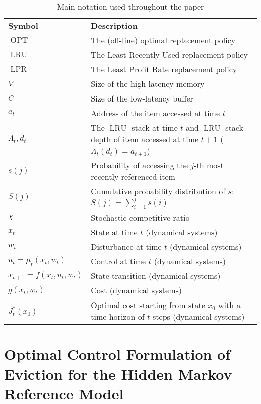 \documentclass[11pt,a4paper]{article}
\DeclareMathOperator{\lru}{LRU}
\DeclareMathOperator{\opt}{OPT}
\DeclareMathOperator{\lpr}{LPR}
\theoremstyle{definition}
\theoremstyle{remark}
\begin{document}
\newcommand{\otoprule}{\specialrule{\heavyrulewidth}{.5em}{.5em}}
\begin{table}
  \centering
  \begin{tabular}{lp{}}
    \toprule
    \textbf{Symbol} & \textbf{Description}\\
    \otoprule
    $\opt$ & The (off-line) optimal replacement policy\\
    $\lru$ & The Least Recently Used replacement policy\\
    $\lpr$ & The Least Profit Rate replacement policy\\
    $V$ & Size of the high-latency memory\\
    $C$ & Size of the low-latency buffer\\
    $a_t$ & Address of the item accessed at time $t$\\
    $\Lambda_t, d_t$ & The $\lru$ stack at time $t$ and $\lru$ stack depth of
    item accessed at time $t+1$ ($\Lambda_t(d_t)=a_{t+1}$)\\
    $s(j)$ & Probability of accessing the $j$-th most recently referenced item\\
    $S(j)$ & Cumulative probability distribution of $s$: $S(j) = \sum_{i=1}^j s(i)$\\
    $\chi$ & Stochastic competitive ratio\\
    $x_t$ & State at time $t$ (dynamical systems)\\
    $w_t$ & Disturbance at time $t$ (dynamical systems)\\
    $u_t=\mu_t(x_t, w_t)$ & Control at time $t$ (dynamical systems)\\
    $x_{t+1}=f(x_t,u_t,w_t)$ & State transition (dynamical systems)\\
    $g(x_t, w_t)$ & Cost (dynamical systems)\\
    $J^*_t(x_0)$ & Optimal cost starting from state $x_0$ with a time horizon of
    $t$ steps (dynamical systems)\\
    \bottomrule
  \end{tabular}
  \caption{Main notation used throughout the paper}
  \label{tab:notation}
\end{table}

\section{Optimal Control Formulation of Eviction for the
Hidden Markov Reference Model}
\label{sec:ocfr}
\end{document}
